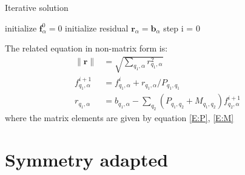 \documentclass{article}
\begin{document}
\begin{algorithm}[t]
    \caption{Iterative solution}
    \label{Alg1}
    initialize $\mathbf{f}_{\alpha}^0 = 0$\;
    initialize residual $\mathbf{r}_{\alpha} = \mathbf{b}_{\alpha}$\;
    step i = 0\;
\end{algorithm}

The related equation in non-matrix form is:
\begin{align}
    \|\mathbf{r}\| &= \sqrt{\sum_{q_1,\alpha} r_{q_1,\alpha}^2} \\
    f_{q_1,\alpha}^{i+1} &= f_{q_1,\alpha}^{i} +  r_{q_1,\alpha} / P_{q_1,q_1} \\
    r_{q_1,\alpha} &= b_{q_1,\alpha} - \sum_{q_2} \left( P_{q_1,q_2} + M_{q_1,q_2} \right)  f_{q_2,\alpha}^{i+1}
\end{align}
where the matrix elements are given by equation \eqref{E:P}, \eqref{E:M}

\section{Symmetry adapted}
\end{document}
